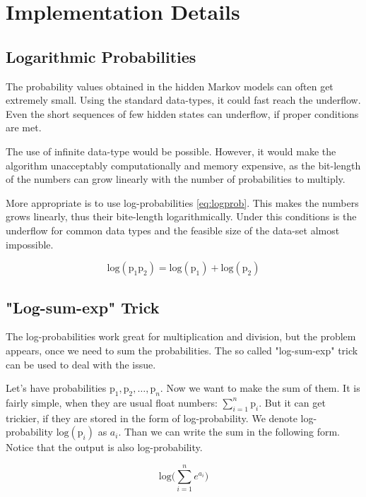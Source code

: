 \documentclass[thesis=M,english]{FITthesis}[2012/10/20]
\begin{document}
\section{Implementation Details}

\subsection{Logarithmic Probabilities}

The probability values obtained in the hidden Markov models can often get extremely small. Using the standard data-types, it could fast reach the underflow. Even the short sequences of few hidden states can underflow, if proper conditions are met. 

The use of infinite data-type would be possible. However, it would make the algorithm unacceptably computationally and memory expensive, as the bit-length of the numbers can grow linearly with the number of probabilities to multiply.

More appropriate is to use log-probabilities \eqref{eq:logprob}. This makes the numbers grows linearly, thus their bite-length logarithmically. Under this conditions is the underflow for common data types and the feasible size of the data-set almost impossible.

\begin{equation}\label{eq:logprob}
\mathrm{log}(\mathrm{p}_1\mathrm{p}_2) = \mathrm{log}(\mathrm{p}_1) + \mathrm{log}(\mathrm{p}_2)
\end{equation}   

\subsection{"Log-sum-exp" Trick}

The log-probabilities work great for multiplication and division, but the problem appears, once we need to sum the probabilities. The so called "log-sum-exp" trick can be used to deal with the issue. 

Let's have probabilities $ \mathrm{p}_1, \mathrm{p}_2, \dots ,\mathrm{p}_n $. Now we want to make the sum of them. It is fairly simple, when they are usual float numbers: $\sum_{i=1}^n \mathrm{p}_i$. But it can get trickier, if they are stored in the form of log-probability. We denote log-probability $\mathrm{log}( \mathrm{p}_i )$ as $a_i$. Than we can write the sum in the following form. Notice that the output is also log-probability.

\begin{equation}\label{eq:logsum}
\mathrm{log} \big( \sum_{i=1}^n e^{a_i} \big)
\end{equation}
\end{document}
